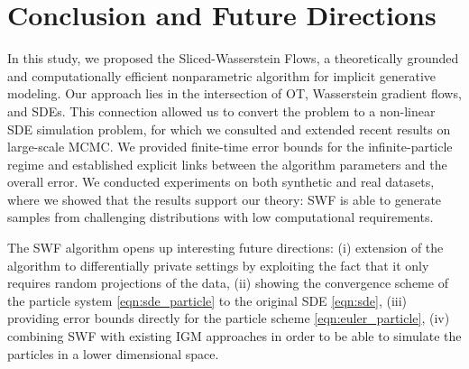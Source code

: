 
\section{Conclusion and Future Directions}

In this study, we proposed the Sliced-Wasserstein Flows, a theoretically grounded and computationally efficient nonparametric algorithm for implicit generative modeling. 
Our approach lies in the intersection of OT, Wasserstein gradient flows, and SDEs. This connection allowed us to convert the problem to a non-linear SDE simulation problem, for which we consulted and extended recent results on large-scale MCMC. We provided finite-time error bounds for the infinite-particle regime and established explicit links between the algorithm parameters and the overall error. We conducted experiments on both synthetic and real datasets, where we showed that the results support our theory: SWF is able to generate samples from challenging distributions with low computational requirements. 

The SWF algorithm opens up interesting future directions: (i) extension of the algorithm to differentially private settings \cite{dwork2014algorithmic} by exploiting the fact that it only requires random projections of the data, (ii) showing the convergence scheme of the particle system \eqref{eqn:sde_particle} to the original SDE \eqref{eqn:sde}, (iii) providing error bounds directly for the particle scheme \eqref{eqn:euler_particle}, (iv) combining SWF with existing IGM approaches in order to be able to simulate the particles in a lower dimensional space.  
 